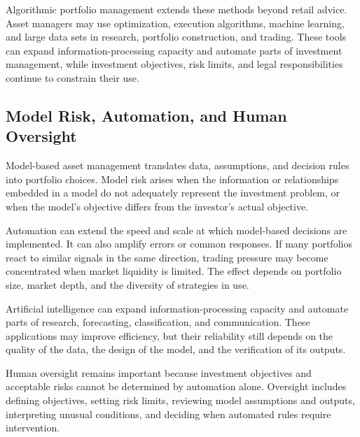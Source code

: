 Algorithmic portfolio management extends these methods beyond retail advice. Asset managers may use optimization, execution algorithms, machine learning, and large data sets in research, portfolio construction, and trading. These tools can expand information-processing capacity and automate parts of investment management, while investment objectives, risk limits, and legal responsibilities continue to constrain their use.

\subsection{Model Risk, Automation, and Human Oversight}

Model-based asset management translates data, assumptions, and decision rules into portfolio choices. Model risk arises when the information or relationships embedded in a model do not adequately represent the investment problem, or when the model's objective differs from the investor's actual objective.

Automation can extend the speed and scale at which model-based decisions are implemented. It can also amplify errors or common responses. If many portfolios react to similar signals in the same direction, trading pressure may become concentrated when market liquidity is limited. The effect depends on portfolio size, market depth, and the diversity of strategies in use.

Artificial intelligence can expand information-processing capacity and automate parts of research, forecasting, classification, and communication. These applications may improve efficiency, but their reliability still depends on the quality of the data, the design of the model, and the verification of its outputs.

Human oversight remains important because investment objectives and acceptable risks cannot be determined by automation alone. Oversight includes defining objectives, setting risk limits, reviewing model assumptions and outputs, interpreting unusual conditions, and deciding when automated rules require intervention.

